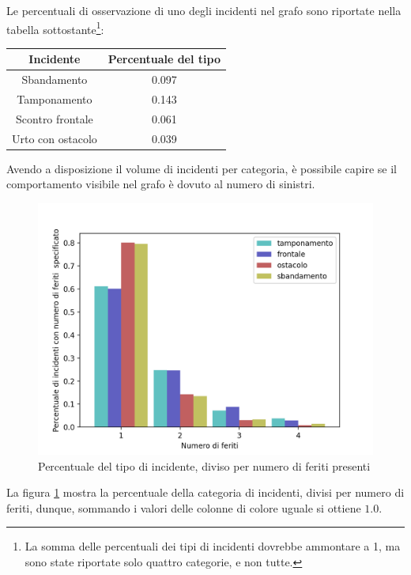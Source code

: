 \documentclass[a4paper]{report}
\begin{document}
Le percentuali di osservazione di uno degli incidenti nel grafo sono riportate 
nella tabella sottostante\footnote{La somma delle percentuali dei tipi di 
incidenti dovrebbe ammontare a 1, ma sono state riportate solo quattro categorie, 
e non tutte.}: 

\begin{center}
    \def\arraystretch{1.5}%
    \begin{tabular}{ |c|c| } 
    \hline
    Incidente & Percentuale del tipo \\ 
    \hline
    \rowcolor{TableGray}
    Sbandamento       & 0.097 \\
    Tamponamento      & 0.143 \\
    \rowcolor{TableGray}
    Scontro frontale  & 0.061 \\
    Urto con ostacolo & 0.039 \\
    \hline
    \end{tabular}
\end{center}

Avendo a disposizione il volume di incidenti per categoria, è possibile capire 
se il comportamento visibile nel grafo è dovuto al numero di sinistri. 

\begin{figure}
    \includegraphics[width=\linewidth]{../src/incidenti/incidenti_senza_coords/natura_incidente/perc_natura_incidente.png}
    \caption{Percentuale del tipo di incidente, diviso per numero di feriti presenti}
    \label{fig:perc-numero-feriti}
\end{figure}

La figura \ref{fig:perc-numero-feriti} mostra la percentuale della categoria 
di incidenti, divisi per numero di feriti, dunque, sommando i valori delle 
colonne di colore uguale si ottiene $1.0$.
\end{document}
